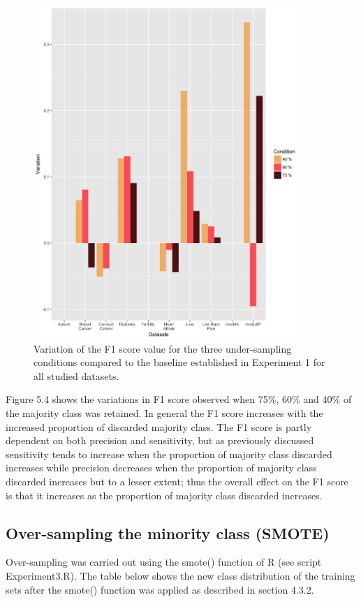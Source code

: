 \begin{figure}[!htbp]
    \centering
    \includegraphics[width=0.9\textwidth]{ThesisTemplate/usingLatex/chapter5Images/F1VariationUnderBySets.png}
    \caption{Variation of the F1 score value for the three under-sampling conditions compared to the baseline established in Experiment 1 for all studied datasets.}
    \label{fig:my_label}
\end{figure}

Figure 5.4 shows the variations in F1 score observed when 75\%, 60\% and 40\% of the majority class was retained. In general the F1 score increases with the increased proportion of discarded majority class. The F1 score is partly dependent on both precision and sensitivity, but as previously discussed sensitivity tends to increase when the proportion of majority class discarded increases while precision decreases when the proportion of majority class discarded increases but to a lesser extent; thus the overall effect on the F1 score is that it increases as the proportion of majority class discarded increases.\newline



\subsection{Over-sampling the minority class (SMOTE)}
Over-sampling was carried out using the smote() function of R (see script Experiment3.R).\newline
The table below shows the new class distribution of the training sets after the smote() function was applied as described in section 4.3.2.\newline

